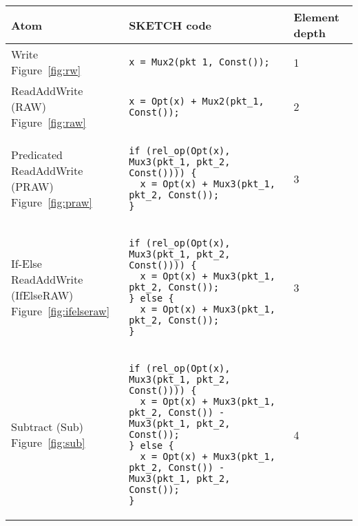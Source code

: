 \begin{table*}[!htbp]
\begin{scriptsize}
  \center
  \begin{tabular}{|p{}|p{}|p{}|}
      \hline
      Atom & SKETCH code & Element depth\\
\hline
\pbox{0.1\textwidth}{Write\\Figure~\ref{fig:rw}} &
{\begin{lstlisting}[style=customctable]
x = Mux2(pkt_1, Const());
\end{lstlisting}} &
1 \\

\hline
\pbox{0.1\textwidth}{ReadAddWrite (RAW)\\Figure~\ref{fig:raw}} &
{\begin{lstlisting}[style=customctable]
x = Opt(x) + Mux2(pkt_1, Const());
\end{lstlisting}} &
2 \\

\hline
\pbox{0.1\textwidth}
{Predicated\\
ReadAddWrite (PRAW)\\Figure~\ref{fig:praw}} &
{\begin{lstlisting}[style=customctable]
if (rel_op(Opt(x), Mux3(pkt_1, pkt_2, Const()))) {
  x = Opt(x) + Mux3(pkt_1, pkt_2, Const());
}
\end{lstlisting}} &
3 \\

\hline
\pbox{0.1\textwidth}
{If-Else\\
ReadAddWrite (IfElseRAW)\\Figure~\ref{fig:ifelseraw}} &
{\begin{lstlisting}[style=customctable]
if (rel_op(Opt(x), Mux3(pkt_1, pkt_2, Const()))) {
  x = Opt(x) + Mux3(pkt_1, pkt_2, Const());
} else {
  x = Opt(x) + Mux3(pkt_1, pkt_2, Const());
}
\end{lstlisting}} &
3 \\

\hline
\pbox{0.1\textwidth}
{Subtract (Sub)\\Figure~\ref{fig:sub}} &
{\begin{lstlisting}[style=customctable]
if (rel_op(Opt(x), Mux3(pkt_1, pkt_2, Const()))) {
  x = Opt(x) + Mux3(pkt_1, pkt_2, Const()) - Mux3(pkt_1, pkt_2, Const());
} else {
  x = Opt(x) + Mux3(pkt_1, pkt_2, Const()) - Mux3(pkt_1, pkt_2, Const());
}
\end{lstlisting}}&
4 \\


\end{tabular}
\end{scriptsize}
\end{table*}
